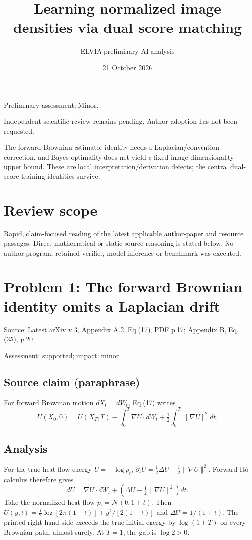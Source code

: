 \documentclass[11pt]{article}
\begin{document}
\title{Learning normalized image densities via dual score matching}

\author{ELVIA preliminary AI analysis}\date{21 October 2026}\maketitle

Preliminary assessment: Minor.\par

Independent scientific review remains pending. Author adoption has not been requested.

The forward Brownian estimator identity needs a Laplacian/convention correction, and Bayes optimality does not yield a fixed-image dimensionality upper bound. These are local interpretation/derivation defects; the central dual-score training identities survive.

\section*{Review scope}

Rapid, claim-focused reading of the latest applicable author-paper and resource passages. Direct mathematical or static-source reasoning is stated below. No author program, retained verifier, model inference or benchmark was executed.

\section*{Problem 1: The forward Brownian identity omits a Laplacian drift}

Source: Latest arXiv v 3, Appendix A.2, Eq.(17), PDF p.17; Appendix B, Eq.(35), p.20

Assessment: supported; impact: minor

\subsection*{Source claim (paraphrase)}

For forward Brownian motion \(dX_t=dW_t\), Eq.(17) writes \[U(X_0,0)=U(X_T,T)-\int_0^T\nabla U\cdot dW_t+\tfrac12\int_0^T\|\nabla U\|^2dt.\]

\subsection*{Analysis}

For the true heat-flow energy \(U=-\log p_t\), \(\partial_tU=\tfrac12\Delta U-\tfrac12\|\nabla U\|^2\). Forward Itô calculus therefore gives \[dU=\nabla U\cdot dW_t+(\Delta U-\tfrac12\|\nabla U\|^2)dt.\] Take the normalized heat flow \(p_t=\mathcal N(0,1+t)\). Then \(U(y,t)=\tfrac12\log[2\pi(1+t)]+y^2/[2(1+t)]\) and \(\Delta U=1/(1+t)\). The printed right-hand side exceeds the true initial energy by \(\log(1+T)\) on every Brownian path, almost surely. At \(T=1\), the gap is \(\log2>0\).
\end{document}
